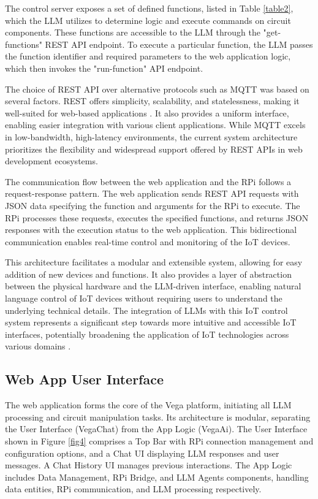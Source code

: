 \documentclass{ieeeaccess}
\begin{document}
The control server exposes a set of defined functions, listed in Table \ref{table2}, which the LLM utilizes to determine logic and execute commands on circuit components. These functions are accessible to the LLM through the "get-functions" REST API endpoint. To execute a particular function, the LLM passes the function identifier and required parameters to the web application logic, which then invokes the "run-function" API endpoint. 

The choice of REST API over alternative protocols such as MQTT was based on several factors. REST offers simplicity, scalability, and statelessness, making it well-suited for web-based applications \cite{s21206904}. It also provides a uniform interface, enabling easier integration with various client applications. While MQTT excels in low-bandwidth, high-latency environments, the current system architecture prioritizes the flexibility and widespread support offered by REST APIs in web development ecosystems.

The communication flow between the web application and the RPi follows a request-response pattern. The web application sends REST API requests with JSON data specifying the function and arguments for the RPi to execute. The RPi processes these requests, executes the specified functions, and returns JSON responses with the execution status to the web application. This bidirectional communication enables real-time control and monitoring of the IoT devices.

This architecture facilitates a modular and extensible system, allowing for easy addition of new devices and functions. It also provides a layer of abstraction between the physical hardware and the LLM-driven interface, enabling natural language control of IoT devices without requiring users to understand the underlying technical details. The integration of LLMs with this IoT control system represents a significant step towards more intuitive and accessible IoT interfaces, potentially broadening the application of IoT technologies across various domains \cite{taylor2010software}.

\subsection{Web App User Interface}

The web application forms the core of the Vega platform, initiating all LLM processing and circuit manipulation tasks. Its architecture is modular, separating the User Interface (VegaChat) from the App Logic (VegaAi). The User Interface shown in Figure \ref{fig4} comprises a Top Bar with RPi connection management and configuration options, and a Chat UI displaying LLM responses and user messages. A Chat History UI manages previous interactions. The App Logic includes Data Management, RPi Bridge, and LLM Agents components, handling data entities, RPi communication, and LLM processing respectively.
\end{document}
